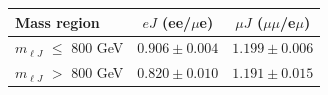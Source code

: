 \begin{table}[htp]
  \label{tab:emu_tf_boosted_perchannel_RunIII2024Summer24}
  \centering
  \begin{tabular}{l | c c}
    \hline
    Mass region & $eJ$ (ee/$\mu$e) & $\mu J$ ($\mu\mu$/e$\mu$) \\
    \hline
    $m_{\ell J}$ $\leq$ 800 GeV & $0.906 \pm 0.004$ & $1.199 \pm 0.006$ \\
    $m_{\ell J}$ $>$ 800 GeV & $0.820 \pm 0.010$ & $1.191 \pm 0.015$ \\
    \hline
  \end{tabular}
\end{table}
